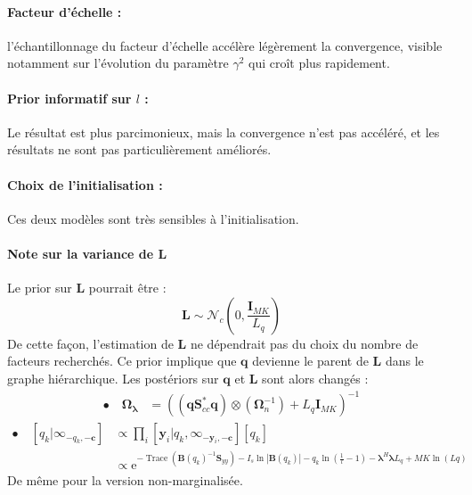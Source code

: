 \documentclass[ 12pt]{article}
\newcommand{\e}{\mathrm{e}}
\newcommand{\tr}[1]{\operatorname{Trace}\!\left(#1\right)}
\begin{document}
\paragraph{Facteur d'échelle : } l'échantillonnage du facteur d'échelle accélère légèrement la convergence, visible notamment sur l'évolution du paramètre $\gamma^2$ qui croît plus rapidement.

\paragraph{Prior informatif sur $l$ :} Le résultat est plus parcimonieux, mais la convergence n'est pas accéléré, et les résultats ne sont pas particulièrement améliorés.

\paragraph{Choix de l'initialisation : } Ces deux modèles sont très sensibles à l'initialisation. 

\paragraph{Note sur la variance de $\bm{L}$}
Le prior sur $\bm{L}$ pourrait être : 
\begin{equation*}
	    \bm{L} \sim \mathcal{N}_c (0,\frac{\bm{I}_{MK}}{L_q})
\end{equation*}
De cette façon, l'estimation de $\bm{L}$ ne dépendrait pas du choix du nombre de facteurs recherchés. Ce prior implique que $\bm{q}$ devienne le parent de $\bm{L}$ dans le graphe hiérarchique. 
Les postériors sur $\bm{q}$ et $\bm{L}$ sont alors changés : 
\begin{align*}
	\bullet \quad   \bm{\Omega_\lambda} &=\left( (\bm{q}\bm{S}_{cc}^* \bm{q}) \otimes (\bm{\Omega}_n^{-1}) + L_q \bm{I}_{MK}   \right)^{-1}
\end{align*}
\begin{align*}
	\bullet \quad  \left[q_k | \infty	_{-q_k,-\bm{c}}  \right] &\propto \prod_i  \left[ \bm{y}_i |q_k, \infty_{-\bm{y}_i,-\bm{c}} \right] [q_k]\\
	& \propto \e^{-\tr{ \bm{B}(q_k)^{-1}\bm{S}_{yy}} - I_s\ln|\bm{B}(q_k)| - q_k \ln\left( \frac{1}{l}-1 \right) - \bm{\lambda}^H\bm{\lambda}L_q + MK \ln(Lq)}
\end{align*}
De même pour la version non-marginalisée.
\end{document}
